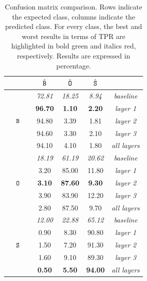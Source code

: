 \begin{table}[t]
\caption{Confusion matrix comparison. Rows indicate the expected class, columns indicate the predicted class. For every class, the best and worst results in terms of TPR are highlighted in bold green and italics red, respectively. Results are expressed in percentage.}
\label{tab:Bootleg:conf_matrix}
\centering
\bgroup
\def\arraystretch{1.5}
\begin{tabular}{||c||c|c|c||c||}
\hline
\hline
$\quad \quad \quad$ & $\quad \hat{\B} \quad$ & $\quad \hat{\O} \quad$  & $\quad \hat{\S} \quad$  &  \\ 
\hline
\hline
 & {\color[HTML]{8E0000} \textit{72.81}} & {\color[HTML]{8E0000} \textit{18.25}} & {\color[HTML]{8E0000} \textit{8.94}}  & \textit{baseline}\cite{Bestagini2013b}   \\
  & {\color[HTML]{326B00} \textbf{96.70}} & {\color[HTML]{326B00} \textbf{1.10}}  & {\color[HTML]{326B00} \textbf{2.20}}  & \textit{layer 1}    \\
 $\B$ & 94.80  & 3.39 & 1.81 & \textit{layer 2}  \\
      & 94.60  & 3.30 & 2.10 & \textit{layer 3}  \\
      & 94.10  & 4.10 & 1.80 & \textit{all layers} \\
\hline 
& {\color[HTML]{8E0000} \textit{18.19}} & {\color[HTML]{8E0000} \textit{61.19}} & {\color[HTML]{8E0000} \textit{20.62}} & \textit{baseline}\cite{Bestagini2013b}   \\
& 3.20 & 85.00 & 11.80 & \textit{layer 1} \\
$\O$ & {\color[HTML]{326B00} \textbf{3.10}}  & {\color[HTML]{326B00} \textbf{87.60}} & {\color[HTML]{326B00} \textbf{9.30}}  & \textit{layer 2}    \\
& 3.90 & 83.90 & 12.20 & \textit{layer 3}  \\
& 2.80 & 87.50 & 9.70  & \textit{all layers} \\ 
\hline
  & {\color[HTML]{8E0000} \textit{12.00}} & {\color[HTML]{8E0000} \textit{22.88}} & {\color[HTML]{8E0000} \textit{65.12}} & \textit{baseline}\cite{Bestagini2013b}  \\
& 0.90 & 8.30 & 90.80 & \textit{layer 1} \\
$\S$ & 1.50 & 7.20 & 91.30 & \textit{layer 2}   \\
& 1.60 & 9.10 & 89.30 & \textit{layer 3}    \\
& {\color[HTML]{326B00} \textbf{0.50}}  & {\color[HTML]{326B00} \textbf{5.50}}  & {\color[HTML]{326B00} \textbf{94.00}} & \textit{all layers} \\ 
\hline

\end{tabular}
\egroup
\end{table}

